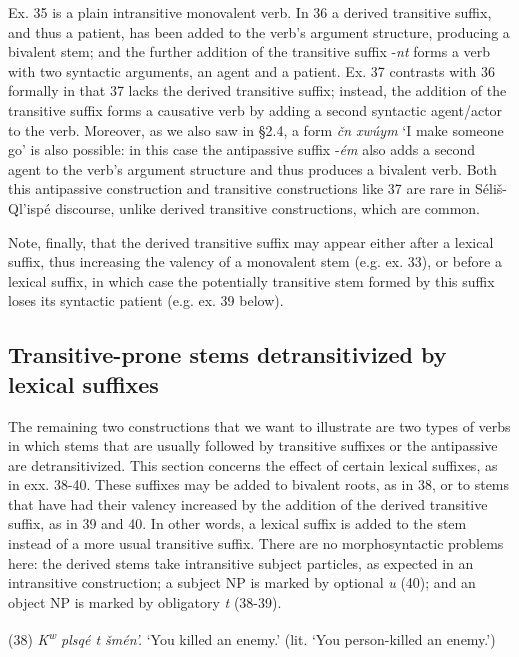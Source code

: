 \documentclass[output=paper,colorlinks,citecolor=brown]{langscibook}
\begin{document}
\bigskip

Ex. 35 is a plain intransitive monovalent verb. In 36 a derived
transitive suffix, and thus a patient, has been added to the verb's
argument structure, producing a bivalent stem; and the further
addition of the transitive suffix -\emph{nt} forms a verb with two
syntactic arguments, an agent and a patient.  Ex. 37 contrasts with 36
formally in that 37 lacks the derived transitive suffix; instead, the
addition of the transitive suffix forms a causative verb by adding a
second syntactic agent/actor to the verb.  Moreover, as we also saw in
\S 2.4, a form \emph{\v{c}n xw\'uym} `I make someone go' is also
possible: in this case the antipassive suffix -\emph{\'em} also adds a
second agent to the verb's argument structure and thus produces a
bivalent verb.  Both this antipassive construction and transitive
constructions like 37 are rare in S\'eli\v{s}-Ql'isp\'e discourse,
unlike derived transitive constructions, which are common.

Note, finally, that the derived transitive suffix may appear either
after a lexical suffix, thus increasing the valency of a monovalent
stem (e.g. ex. 33), or before a lexical suffix, in which case the
potentially transitive stem formed by this suffix loses its syntactic
patient (e.g. ex. 39 below).

\subsection{Transitive-prone stems detransitivized by lexical suffixes}  %

The remaining two constructions that we want to illustrate are two
types of verbs in which stems that are usually followed by transitive
suffixes or the antipassive are detransitivized.  This section
concerns the effect of certain lexical suffixes, as in exx. 38-40.
These suffixes may be added to bivalent roots, as in 38, or to stems
that have had their valency increased by the addition of the derived
transitive suffix, as in 39 and 40.  In other words, a lexical suffix
is added to the stem instead of a more usual transitive suffix.  There
are no morphosyntactic problems here: the derived stems take
intransitive subject particles, as expected in an intransitive
construction; a subject NP is marked by optional \emph{{\textltilde}u}
(40); and an object NP is marked by obligatory \emph{t} (38-39).

\clearpage

(38) \emph{{K\textsuperscript w} plsq\'e t \v{s}m\'en'.} `You killed an
enemy.' (lit. `You person-killed an enemy.')
\end{document}

